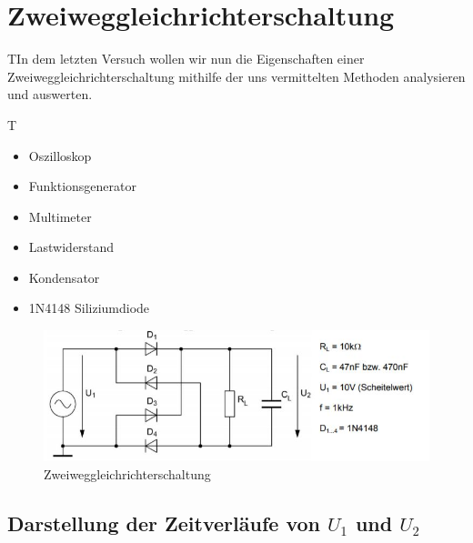 \documentclass{article}
\begin{document}
\newpage

\section{Zweiweggleichrichterschaltung}

\begin{task}
  TIn dem letzten Versuch wollen wir nun die Eigenschaften einer Zweiweggleichrichterschaltung mithilfe der uns vermittelten
  Methoden analysieren und auswerten.
\end{task}

\begin{devlist}
  T\begin{itemize}
    \item Oszilloskop
    \item Funktionsgenerator
    \item Multimeter
    \item Lastwiderstand
    \item Kondensator
    \item 1N4148 Siliziumdiode
  \end{itemize}
\end{devlist}

\begin{figure}[h]
  \begin{center}
    \includegraphics{../assets/images/EL1P2/aufgabe 4 schaltung.JPG}
    \caption{Zweiweggleichrichterschaltung}
  \end{center}
\end{figure}

\newpage

\subsection{Darstellung der Zeitverläufe von $U_1$ und $U_2$}
\end{document}
